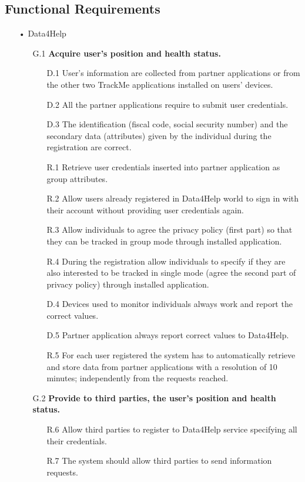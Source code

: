 \subsection{Functional Requirements}
\begin{enumerate}
\item[•]{\Large Data4Help}
	\begin{enumerate}
	\item [G.1] \textbf{Acquire user's position and health status.}
		\begin{enumerate}
		\item [D.1] User's information are collected from partner applications or from the other two TrackMe applications installed on users' devices.
		\item [D.2] All the partner applications require to submit user credentials.
		\item [D.3] The identification (fiscal code, social security number) and the secondary data (attributes) given by the individual during the registration are correct.
		\item [R.1] Retrieve user credentials inserted into partner application as group attributes.
		\item [R.2] Allow users already registered in Data4Help world to sign in with their account without providing user credentials again.
		\item [R.3] Allow individuals to agree the privacy policy (first part) so that they can be tracked in group mode through installed application.  
		\item [R.4] During the registration allow individuals to specify if they are also interested to be tracked in single mode (agree the second part of privacy policy) through installed application. 
		\item [D.4] Devices used to monitor individuals always work and report 			the correct values.	
    	\item [D.5] Partner application always report correct values to Data4Help.
    	\item [R.5] For each user registered the system has to automatically retrieve and store data from partner applications with a resolution of 10 minutes; independently from the requests reached.
    	\end{enumerate}	
    	
    \item [G.2] \textbf{Provide to third parties, the user's position and health status.}
    	\begin{enumerate} 
    	\item [R.6] Allow third parties to register to Data4Help service specifying all their credentials.
		\item [R.7] The system should allow third parties to send information requests.
    	\end{enumerate}	
		

\end{enumerate}
\end{enumerate}
